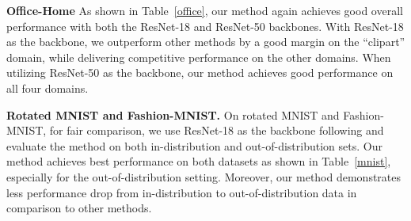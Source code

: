 \documentclass{article} \usepackage[table]{xcolor}
\begin{document}
\textbf{Office-Home} As shown in Table~\ref{office}, our method again achieves good overall performance with both the ResNet-18 and ResNet-50 backbones. 
With ResNet-18 as the backbone, we outperform other methods by a good margin on the ``clipart'' domain, while delivering competitive performance on the other domains.
When utilizing ResNet-50 as the backbone, our method achieves good performance on all four domains.

\textbf{Rotated MNIST and Fashion-MNIST.} 
On rotated MNIST and Fashion-MNIST, for fair comparison, we use ResNet-18 as the backbone following \citep{piratla2020efficient} and evaluate the method on both in-distribution and out-of-distribution sets.
Our method achieves best performance on both datasets as shown in Table~\ref{mnist}, especially for the out-of-distribution setting. Moreover, our method demonstrates less performance drop from in-distribution to out-of-distribution data in comparison to other methods. 


\begin{table}[t]
\begin{center}
\caption{\textbf{Comparison on rotated MNIST and Fashion-MNIST.} 
In-distribution performance is evaluated on the test sets of MNIST and Fashion-MNIST with rotation angles of $15^\circ$, $30^\circ$, $45^\circ$, $60^\circ$ and $75^\circ$, while the out-of-distribution performance is evaluated on test sets with angles of $0^\circ$ and $90^\circ$. We achieve the best performance on both the in-distribution and out-of-distribution test sets.}
\label{mnist}
\end{center}
\end{table}
\end{document}
